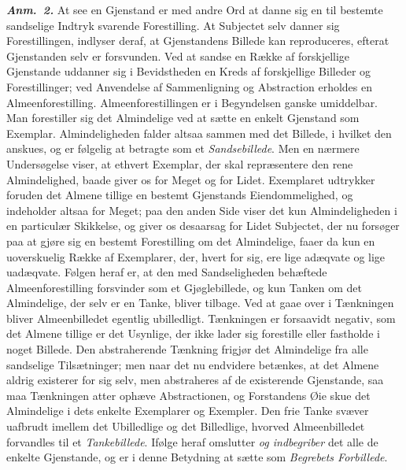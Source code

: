 \documentclass[12pt]{book}
\newcommand{\anm}[1]{\emph{\textbf{Anm.~#1.}}}
\newcommand{\opage}[1]{\marginnote{\footnotesize\textit{[#1]}}}
\begin{document}
\anm{2} At see en Gjenstand er med andre Ord at danne sig en til bestemte
sandselige Indtryk svarende Forestilling. At Subjectet selv danner sig
Forestillingen, indlyser deraf, at Gjenstandens Billede kan reproduceres,
efterat Gjenstanden selv er forsvunden. Ved at sandse en Række af forskjellige
Gjenstande uddanner sig i Bevidstheden en Kreds af forskjellige Billeder og
Forestillinger; ved Anvendelse af Sammenligning og Abstraction erholdes en
Almeenforestilling. Almeenforestillingen er i Begyndelsen ganske umiddelbar.
Man forestiller sig det Almindelige ved at sætte en enkelt Gjenstand som
Exemplar. Almindeligheden falder altsaa sammen med det Billede, i hvilket den
anskues, og er følgelig at betragte som et \emph{Sandsebillede}. Men en
nærmere Undersøgelse viser, at ethvert Exemplar, der skal repræsentere den
rene Almindelighed, baade giver os for Meget og for Lidet. Exemplaret
udtrykker foruden det Almene tillige en bestemt Gjenstands Eiendommelighed, og
indeholder altsaa for Meget; paa den anden Side viser det kun Almindeligheden
i en
\opage{8} %
particulær Skikkelse, og giver os desaarsag for Lidet Subjectet, der nu
forsøger paa at gjøre sig en bestemt Forestilling om det Almindelige, faaer da
kun en uoverskuelig Række af Exemplarer, der, hvert for sig, ere lige adæqvate
og lige uadæqvate. Følgen heraf er, at den med Sandseligheden behæftede
Almeenforestilling forsvinder som et Gjøglebillede, og kun Tanken om det
Almindelige, der selv er en Tanke, bliver tilbage. Ved at gaae over i
Tænkningen bliver Almeenbilledet egentlig ubilledligt. Tænkningen er
forsaavidt negativ, som det Almene tillige er det Usynlige, der ikke lader sig
forestille eller fastholde i noget Billede. Den abstraherende Tænkning frigjør
det Almindelige fra alle sandselige Tilsætninger; men naar det nu endvidere
betænkes, at det Almene aldrig existerer for sig selv, men abstraheres af de
existerende Gjenstande, saa maa Tænkningen atter ophæve Abstractionen, og
Forstandens Øie skue det Almindelige i dets enkelte Exemplarer og Exempler.
Den frie Tanke svæver uafbrudt imellem det Ubilledlige og det Billedlige,
hvorved Almeenbilledet forvandles til et \emph{Tankebillede}. Ifølge heraf
omslutter \emph{og indbegriber} det alle de enkelte Gjenstande, og er i denne
Betydning at sætte som \emph{Begrebets Forbillede}.
\end{document}
